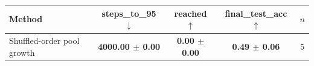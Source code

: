 \begin{tabular}{lcccc}
\toprule
Method & steps\_to\_95 $\downarrow$ & reached $\uparrow$ & final\_test\_acc $\uparrow$ & $n$ \\
\midrule
Shuffled-order pool growth & \textbf{4000.00 $\pm$ 0.00} & \textbf{0.00 $\pm$ 0.00} & \textbf{0.49 $\pm$ 0.06} & 5 \\
\bottomrule
\end{tabular}
